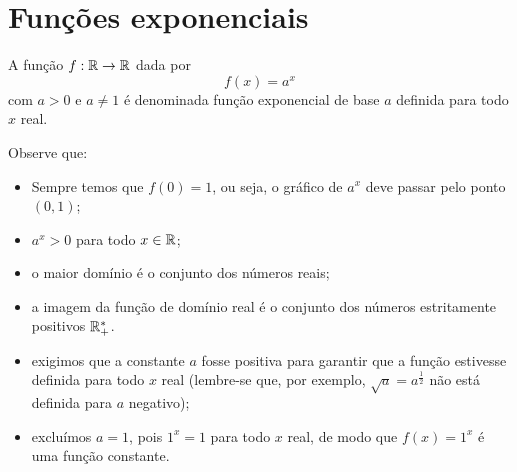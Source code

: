  \chapter{Funções exponenciais}

\begin{obs}
 A função $f: \mathbb{R} \rightarrow \mathbb{R}$ dada por
\begin{equation*}
f(x) = a^x
\end{equation*}
 com $a>0$ e $a \neq 1$ é denominada função exponencial de base $a$ definida para todo $x$ real.
\end{obs}

 Observe que:
 \begin{itemize}
 \item Sempre temos que $f(0)=1$, ou seja, o gráfico de $a^x$ deve passar pelo ponto $(0,1)$;
 \item $a^x > 0$ para todo $x\in\mathbb{R}$;
 \item o maior domínio é o conjunto dos números reais;
 \item a imagem da função de domínio real é o conjunto dos números estritamente positivos $\mathbb{R}_{+}^*$.
  \item exigimos que a constante $a$ fosse positiva para garantir que a função estivesse definida para todo $x$ real (lembre-se que, por exemplo, $\sqrt{a}= a^{\frac{1}{2}}$ não está definida para $a$ negativo);
  \item excluímos $a=1$, pois $1^x=1$ para todo $x$ real, de modo que $f(x)= 1^x$ é uma função constante.
 \end{itemize}

